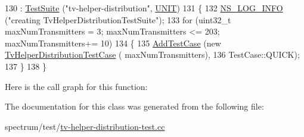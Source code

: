 \begin{DoxyCode}
130   : \hyperlink{classns3_1_1TestSuite_a904b0c40583b744d30908aeb94636d1a}{TestSuite} (\textcolor{stringliteral}{"tv-helper-distribution"}, \hyperlink{classns3_1_1TestSuite_a1ebfcab34ec8161e085e8e3a1855eae0a3885375a3787abf60431f8454b3cadbd}{UNIT})
131 \{
132   \hyperlink{group__logging_gafbd73ee2cf9f26b319f49086d8e860fb}{NS\_LOG\_INFO} (\textcolor{stringliteral}{"creating TvHelperDistributionTestSuite"});
133   \textcolor{keywordflow}{for} (uint32\_t maxNumTransmitters = 3; maxNumTransmitters <= 203; maxNumTransmitters+= 10)
134     \{
135       \hyperlink{classns3_1_1TestCase_a3718088e3eefd5d6454569d2e0ddd835}{AddTestCase} (\textcolor{keyword}{new} \hyperlink{classTvHelperDistributionTestCase}{TvHelperDistributionTestCase} (
      maxNumTransmitters), 
136                    TestCase::QUICK);
137     \}
138 \}
\end{DoxyCode}


Here is the call graph for this function\+:




The documentation for this class was generated from the following file\+:\begin{DoxyCompactItemize}
\item 
spectrum/test/\hyperlink{tv-helper-distribution-test_8cc}{tv-\/helper-\/distribution-\/test.\+cc}\end{DoxyCompactItemize}
